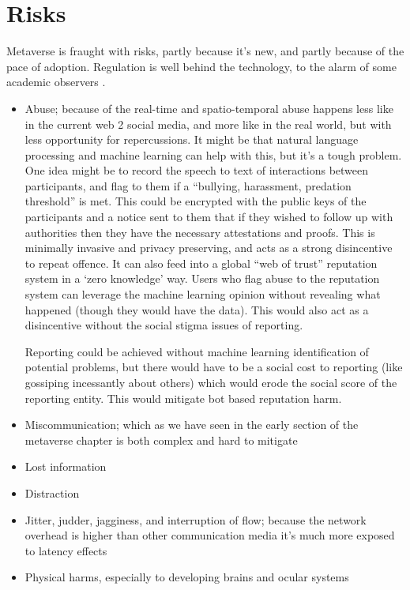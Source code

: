 \section{Risks}
Metaverse is fraught with risks, partly because it's new, and partly because of the pace of adoption. Regulation is well behind the technology, to the alarm of some academic observers \cite{rosenberg2022regulation}.
\begin{itemize}
\item Abuse; because of the real-time and spatio-temporal abuse happens less like in the current web 2 social media, and more like in the real world, but with less opportunity for repercussions. It might be that natural language processing and machine learning can help with this, but it's a tough problem. One idea might be to record the speech to text of interactions between participants, and flag to them if a ``bullying, harassment, predation threshold'' is met. This could be encrypted with the public keys of the participants and a notice sent to them that if they wished to follow up with authorities then they have the necessary attestations and proofs. This is minimally invasive and privacy preserving, and acts as a strong disincentive to repeat offence. It can also feed into a global ``web of trust'' reputation system in a `zero knowledge' way. Users who flag abuse to the reputation system can leverage the machine learning opinion without revealing what happened (though they would have the data). This would also act as a disincentive without the social stigma issues of reporting.\par
Reporting could be achieved without machine learning identification of potential problems, but there would have to be a social cost to reporting (like gossiping incessantly about others) which would erode the social score of the reporting entity. This would mitigate bot based reputation harm.
\item Miscommunication; which as we have seen in the early section of the metaverse chapter is both complex and hard to mitigate
\item Lost information
\item Distraction
\item Jitter, judder, jagginess, and interruption of flow; because the network overhead is higher than other communication media it's much more exposed to latency effects 
\item Physical harms, especially to developing brains and ocular systems
\end{itemize}
%
